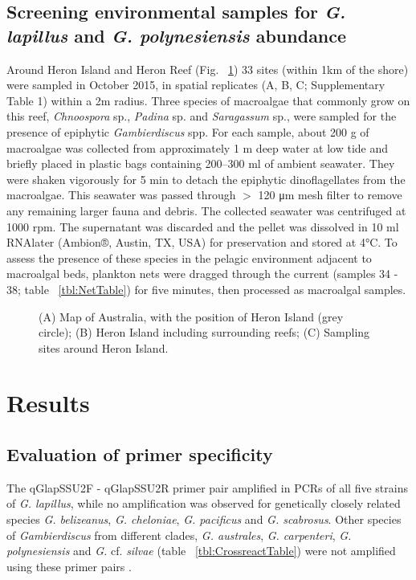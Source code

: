 \documentclass[12pt]{article}
\begin{document}
\subsection*{Screening environmental samples for \emph{G. lapillus} and \emph{G. polynesiensis} abundance}
Around Heron Island and Heron Reef (Fig. ~\ref{fig:samplesites}) 33 sites (within 1km of the shore) were sampled in October 2015, in spatial replicates (A, B, C; Supplementary Table 1) within a 2m radius. Three species of macroalgae that commonly grow on this reef, \textit{Chnoospora} sp., \textit{Padina} sp. and \textit{Saragassum} sp., were sampled for the presence of epiphytic \emph{Gambierdiscus} spp. For each sample, about 200 g of macroalgae was collected from approximately 1 m deep water at low tide and briefly placed in plastic bags containing 200–300 ml of ambient seawater. They were shaken vigorously for 5 min to detach the epiphytic dinoflagellates from the macroalgae. This seawater was passed through $>$ 120 μm mesh filter to remove any remaining larger fauna and debris. The collected seawater was centrifuged at 1000 rpm. The supernatant was discarded and the pellet was dissolved in 10 ml RNAlater (Ambion®, Austin, TX, USA) for preservation and stored at 4°C.
To assess the presence of these species in the pelagic environment adjacent to macroalgal beds, plankton nets were dragged through the current (samples 34 - 38; table ~\ref{tbl:NetTable}) for five minutes, then processed as macroalgal samples.

\FloatBarrier 
\begin{figure} 
\caption{(A) Map of Australia, with the position of Heron Island (grey circle); (B) Heron Island including surrounding reefs; (C) Sampling sites around Heron Island.} 
\label{fig:samplesites}
\end{figure} 
\FloatBarrier

\newpage
\section*{Results}
\subsection*{Evaluation of primer specificity}
The qGlapSSU2F - qGlapSSU2R primer pair amplified in PCRs of all five strains of \emph{G. lapillus}, while no amplification was observed for genetically closely related species \emph{G. belizeanus}, \emph{G. cheloniae}, \emph{G. pacificus} and \emph{G. scabrosus}. Other species of \emph{Gambierdiscus} from different clades, \emph{G. australes}, \emph{G. carpenteri}, \emph{G. polynesiensis} and \emph{G.} cf. \emph{silvae} (table ~\ref{tbl:CrossreactTable}) were not amplified using these primer pairs \cite{smith2016new,kretzschmar2016characterization}.
\end{document}
